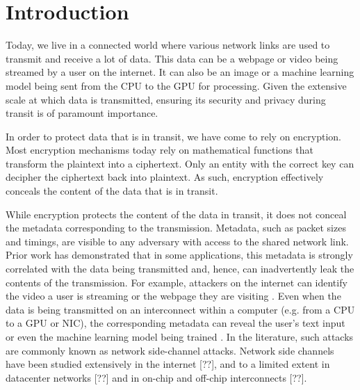 
\chapter{Introduction}
\label{ch:Introduction}

Today, we live in a connected world where various network links are used to transmit and receive a lot of data. 
This data can be a webpage or video being streamed by a user on the internet. 
It can also be an image or a machine learning model being sent from the CPU to the GPU for processing. 
Given the extensive scale at which data is transmitted, ensuring its security and privacy during transit is of paramount importance.

In order to protect data that is in transit, we have come to rely on encryption. 
Most encryption mechanisms today rely on mathematical functions that transform the plaintext into a ciphertext. 
Only an entity with the correct key can decipher the ciphertext back into plaintext. 
As such, encryption effectively conceals the content of the data that is in transit.

While encryption protects the content of the data in transit, it does not conceal the metadata corresponding to the transmission.
Metadata, such as packet sizes and timings, are visible to any adversary with access to the shared network link.
Prior work has demonstrated that in some applications, this metadata is strongly correlated with the data being transmitted and, hence, can inadvertently leak the contents of the transmission.
For example, attackers on the internet can identify the video a user is streaming \cite{schuster2017beautyburst} or the webpage they are visiting \cite{gong2010fingerprinting, wang2014supersequence}.
Even when the data is being transmitted on an interconnect within a computer (e.g. from a CPU to a GPU or NIC), the corresponding metadata can reveal the user's text input or even the machine learning model being trained \cite{tan2021invisible}.
In the literature, such attacks are commonly known as network side-channel attacks.
Network side channels have been studied extensively in the internet [??], and to a limited extent in datacenter networks [??] and in on-chip and off-chip interconnects [??].

